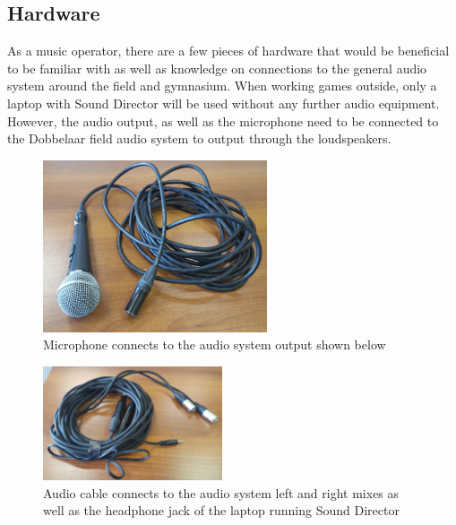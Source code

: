 \documentclass{article}
\begin{document}
\subsection{Hardware}
As a music operator, there are a few pieces of hardware that would be beneficial to be familiar with as well as knowledge on connections to the general audio system around the field and gymnasium. When working games outside, only a laptop with Sound Director will be used without any further audio equipment. However, the audio output, as well as the microphone need to be connected to the Dobbelaar field audio system to output through the loudspeakers. 

\begin{figure}[h]
\begin{center}
\includegraphics[width=250px]{images/Microphone.png}
\caption{Microphone connects to the audio system output shown below}
\end{center}
\end{figure}

\begin{figure}[h]
\begin{center}
\includegraphics[width=200px]{images/AudioCable.png}
\caption{Audio cable connects to the audio system left and right mixes as well as the headphone jack of the laptop running Sound Director}
\end{center}
\end{figure}
\end{document}
